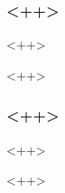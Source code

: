 

\begin{frame}[ctb!]
  \frametitle{<++>}
  <++>
\end{frame}<++>


\begin{frame}[ctb!]
  \frametitle{<++>}
  <++>
\end{frame}<++>
